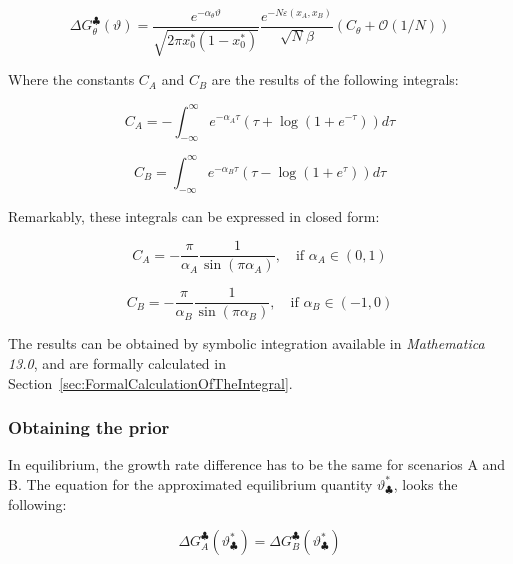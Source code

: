 \documentclass{article}
\theoremstyle{definition}
\begin{document}
\begin{equation}
    \Delta G_\theta^\clubsuit(\vartheta) = 
    \frac{e^{-\alpha_\theta \vartheta}}{\sqrt{2 \pi x_0^* (1-x_0^*)}} \frac{e^{- N \varepsilon(x_A,x_B)}}{\sqrt{N} \beta}
    \left ( C_\theta + \mathcal{O}(1/N) \right )
\end{equation}


Where the constants $C_A$ and $C_B$ are the results of the following integrals:

\begin{equation}
    \label{eq:CA_o}
    C_A = - \int_{-\infty}^\infty e^{-\alpha_A \tau} (\tau + \log \left ( 1 + e^{-\tau} \right )) d \tau
\end{equation}

\begin{equation}
    \label{eq:CB_o}
    C_B = \int_{-\infty}^\infty e^{-\alpha_B \tau} (\tau - \log \left ( 1 + e^{\tau} \right )) d \tau
\end{equation}

Remarkably, these integrals can be expressed in closed form:

\begin{equation}
    \label{eq:CA_res}
    C_A = - \frac{\pi}{\alpha_A} \frac{1}{\sin(\pi \alpha_A)}, \quad \text{if } \alpha_A \in (0,1)
\end{equation}

\begin{equation}
    \label{eq:CB_res}
    C_B = - \frac{\pi}{\alpha_B} \frac{1}{\sin(\pi \alpha_B)}, \quad \text{if } \alpha_B \in (-1,0)
\end{equation}

The results can be obtained by symbolic integration \cite{tool:WolframIntegrate} available in \textit{Mathematica 13.0}, and are formally calculated in Section~\ref{sec:FormalCalculationOfTheIntegral}.

\subsubsection{Obtaining the prior}

In equilibrium, the growth rate difference has to be the same for scenarios A and B.
The equation for the approximated equilibrium quantity $\vartheta^*_\clubsuit$, looks the following:

\begin{equation}
    \Delta G_A^\clubsuit(\vartheta^*_\clubsuit) = \Delta G_B^\clubsuit(\vartheta^*_\clubsuit)
\end{equation}
\end{document}
